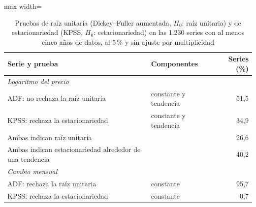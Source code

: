 \begin{table}[htbp]\centering\small
\caption{Pruebas de raíz unitaria (Dickey--Fuller aumentada, $H_0$: raíz unitaria) y de estacionariedad (KPSS, $H_0$: estacionariedad) en las 1.230 series con al menos cinco años de datos, al 5\,\% y sin ajuste por multiplicidad}\label{tab:adf}
\begin{adjustbox}{max width=\textwidth}\begin{tabular}{llr}\toprule
Serie y prueba & Componentes & Series (\%)\\ \midrule
\multicolumn{3}{l}{\emph{Logaritmo del precio}}\\
\quad ADF: no rechaza la raíz unitaria & constante y tendencia & 51{,}5 \\
\quad KPSS: rechaza la estacionariedad & constante y tendencia & 34{,}9 \\
\quad Ambas indican raíz unitaria & & 26{,}6 \\
\quad Ambas indican estacionariedad alrededor de una tendencia & & 40{,}2 \\
\multicolumn{3}{l}{\emph{Cambio mensual}}\\
\quad ADF: rechaza la raíz unitaria & constante & 95{,}7 \\
\quad KPSS: rechaza la estacionariedad & constante & 0{,}7 \\
\bottomrule\end{tabular}\end{adjustbox}\end{table}
